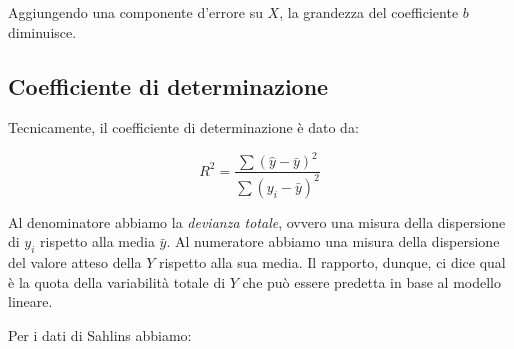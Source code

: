 \documentclass[
  11pt,
]{krantz}
\makeatletter
\newenvironment{Shaded}{\begin{snugshade}}{\end{snugshade}}
\newcommand{\AttributeTok}[1]{\textcolor[rgb]{0.61,0.61,0.61}{#1}}
\newcommand{\CommentTok}[1]{\textcolor[rgb]{0.37,0.37,0.37}{\textit{#1}}}
\newcommand{\DecValTok}[1]{\textcolor[rgb]{0.06,0.06,0.06}{#1}}
\newcommand{\FunctionTok}[1]{\textcolor[rgb]{0,0,0}{#1}}
\newcommand{\NormalTok}[1]{#1}
\newcommand{\OtherTok}[1]{\textcolor[rgb]{0.37,0.37,0.37}{#1}}
\newcommand{\SpecialCharTok}[1]{\textcolor[rgb]{0,0,0}{#1}}
\newenvironment{kframe}{%
\medskip{}
\setlength{\fboxsep}{.8em}
 \def\at@end@of@kframe{}%
 \ifinner\ifhmode%
  \def\at@end@of@kframe{\end{minipage}}%
  \begin{minipage}{\columnwidth}%
 \fi\fi%
 \def\FrameCommand##1{\hskip\@totalleftmargin \hskip-\fboxsep
 \colorbox{shadecolor}{##1}\hskip-\fboxsep
     \hskip-\linewidth \hskip-\@totalleftmargin \hskip\columnwidth}%
 \MakeFramed {\advance\hsize-\width
   \@totalleftmargin\z@ \linewidth\hsize
   \@setminipage}}%
 {\par\unskip\endMakeFramed%
 \at@end@of@kframe}
\renewenvironment{Shaded}{\begin{kframe}}{\end{kframe}}
\makeatother
\begin{document}
Aggiungendo una componente d'errore su \(X\), la grandezza del coefficiente \(b\) diminuisce.

\hypertarget{coefficiente-di-determinazione}{%
\subsection{Coefficiente di determinazione}\label{coefficiente-di-determinazione}}

Tecnicamente, il coefficiente di determinazione è dato da:

\[
R^2 = \frac{\sum(\hat{y} - \bar{y})^2}{\sum(y_i - \bar{y})^2}
\]

Al denominatore abbiamo la \emph{devianza totale}, ovvero una misura della dispersione di \(y_i\) rispetto alla media \(\bar{y}\). Al numeratore abbiamo una misura della dispersione del valore atteso della \(Y\) rispetto alla sua media. Il rapporto, dunque, ci dice qual è la quota della variabilità totale di \(Y\) che può essere predetta in base al modello lineare.

Per i dati di Sahlins abbiamo:

\begin{Shaded}
\end{Shaded}
\end{document}
